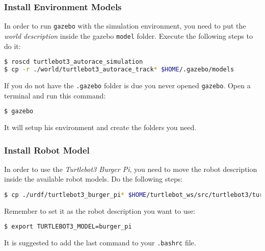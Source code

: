 
\begin{frame}[fragile]
	\frametitle{Install Environment Models}
In order to run \texttt{gazebo} with the simulation environment, you need to put the \textit{world description} inside the gazebo \verb$model$ folder. Execute the following steps to do it:
\begin{lstlisting}[language=bash]
$ roscd turtlebot3_autorace_simulation
$ cp -r ./world/turtlebot3_autorace_track* $HOME/.gazebo/models
\end{lstlisting}

If you do not have the \verb$.gazebo$ folder is due you never opened \texttt{gazebo}.
Open a terminal and run this command:
\begin{lstlisting}[language=bash]
$ gazebo	
\end{lstlisting}
It will setup his environment and create the folders you need.
\end{frame}


\begin{frame}[fragile]
	\frametitle{Install Robot Model}
In order to use the \textit{Turtlebot3 Burger Pi}, you need to move the robot description inside the available robot models. Do the following steps:
\begin{lstlisting}[language=bash]
$ cp ./urdf/turtlebot3_burger_pi* $HOME/turtlebot_ws/src/turtlebot3/turtlebot3_description/urdf
\end{lstlisting}

Remember to set it as the robot description you want to use:

\begin{lstlisting}[language=bash]
$ export TURTLEBOT3_MODEL=burger_pi
\end{lstlisting}
It is suggested to add the last command to your \verb$.bashrc$ file.
\end{frame}
